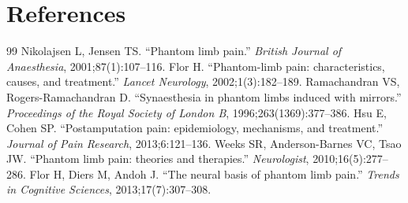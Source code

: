 \section*{References}
\begin{thebibliography}{99}
 Nikolajsen L, Jensen TS. ``Phantom limb pain.'' \textit{British Journal of Anaesthesia}, 2001;87(1):107--116.
 Flor H. ``Phantom-limb pain: characteristics, causes, and treatment.'' \textit{Lancet Neurology}, 2002;1(3):182--189.
 Ramachandran VS, Rogers-Ramachandran D. ``Synaesthesia in phantom limbs induced with mirrors.'' \textit{Proceedings of the Royal Society of London B}, 1996;263(1369):377--386.
 Hsu E, Cohen SP. ``Postamputation pain: epidemiology, mechanisms, and treatment.'' \textit{Journal of Pain Research}, 2013;6:121--136.
 Weeks SR, Anderson-Barnes VC, Tsao JW. ``Phantom limb pain: theories and therapies.'' \textit{Neurologist}, 2010;16(5):277--286.
 Flor H, Diers M, Andoh J. ``The neural basis of phantom limb pain.'' \textit{Trends in Cognitive Sciences}, 2013;17(7):307--308.

\end{thebibliography}
